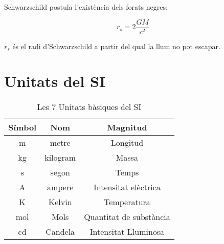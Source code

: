 Schwarzschild postula l'existència dels forats negres:

\begin{equation}
    r_s = 2\frac{GM}{c^2}
\end{equation}

$r_s$ és el radi d'Schwarzschild a partir del qual la llum no pot escapar.

\section{Unitats del SI}
\label{sec:unitats_del_si}

\begin{table}[H]
    \centering
    \caption{Les 7 Unitats bàsiques del SI}
    \label{tab:si_unitats_basiques}
    \begin{tabular}{ccc}
        \toprule
        Símbol  &   Nom     &   Magnitud \\
        \midrule
        \si{\metre}     & metre     & Longitud \\
        \si{\kilo\gram} & kilogram  & Massa\\
        \si{\second}    & segon     & Temps \\
        \si{\ampere}    & ampere    & Intensitat elèctrica \\
        \si{\kelvin}    & Kelvin    & Temperatura \\
        \si{\mol}       & Mols      & Quantitat de substància\\
        \si{\candela}   & Candela   & Intensitat Lluminosa\\

        \bottomrule

    \end{tabular}
\end{table}

